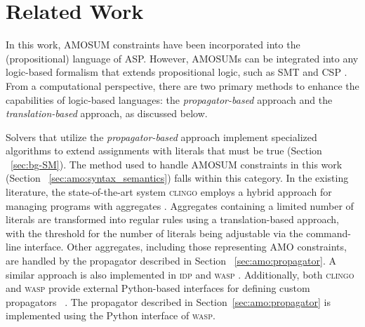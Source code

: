 \chapter{Related Work}
\label{sec:rw}
In this work, AMOSUM constraints have been incorporated into the (propositional) language of ASP. 
However, AMOSUMs can be integrated into any logic-based formalism that extends propositional logic, 
such as SMT \cite{DBLP:journals/jacm/NieuwenhuisOT06} and CSP \cite{DBLP:journals/eor/BrailsfordPS99}. 
From a computational perspective, there are two primary methods to enhance the capabilities of logic-based languages: 
the \textit{propagator-based} approach and the \textit{translation-based} approach, as discussed below.

Solvers that utilize the \emph{propagator-based} approach implement specialized algorithms 
to extend assignments with literals that must be true (Section ~\ref{sec:bg-SM}). 
The method used to handle AMOSUM constraints in this work (Section ~\ref{sec:amo:syntax_semantics}) falls within this category. 
In the existing literature, the state-of-the-art system \textsc{clingo} \cite{DBLP:journals/tplp/GebserKKS19} employs a 
hybrid approach for managing programs with aggregates \cite{DBLP:conf/iclp/GebserKKS09}. Aggregates containing a limited 
number of literals are transformed into regular rules using a translation-based approach, with the threshold for the number 
of literals being adjustable via the command-line interface. Other aggregates, including those representing AMO constraints, 
are handled by the propagator described in Section ~\ref{sec:amo:propagator}.
A similar approach is also implemented in \textsc{idp} \cite{Denecker2010DPLLAggAE,DBLP:journals/ngc/0001JCJBD16} 
and \textsc{wasp} \cite{DBLP:journals/tplp/AlvianoDM18}. 
Additionally, both \textsc{clingo} and \textsc{wasp} 
provide external Python-based interfaces for defining custom 
propagators ~\cite{DBLP:journals/algorithms/CabalarFSW23,DBLP:journals/tplp/DodaroR20}. 
The propagator described in Section~\ref{sec:amo:propagator} is implemented using the Python interface of \textsc{wasp}.

